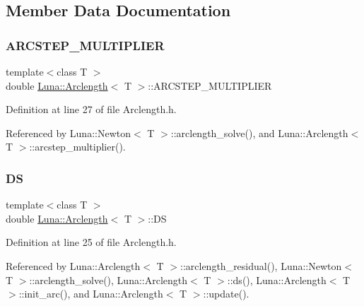 \subsection{Member Data Documentation}
\mbox{\label{classLuna_1_1Arclength_ae1ff8d41d3e81d9ce335d19de4a269cc}} 
\subsubsection{\texorpdfstring{A\+R\+C\+S\+T\+E\+P\+\_\+\+M\+U\+L\+T\+I\+P\+L\+I\+ER}{ARCSTEP\_MULTIPLIER}}
{\footnotesize\ttfamily template$<$class T $>$ \\
double \hyperlink{classLuna_1_1Arclength}{Luna\+::\+Arclength}$<$ T $>$\+::A\+R\+C\+S\+T\+E\+P\+\_\+\+M\+U\+L\+T\+I\+P\+L\+I\+ER\hspace{0.3cm}{\ttfamily [protected]}}



Definition at line 27 of file Arclength.\+h.



Referenced by Luna\+::\+Newton$<$ T $>$\+::arclength\+\_\+solve(), and Luna\+::\+Arclength$<$ T $>$\+::arcstep\+\_\+multiplier().

\mbox{\label{classLuna_1_1Arclength_a6797d7b76d3e27c00b9c4c6ab9970405}} 
\subsubsection{\texorpdfstring{DS}{DS}}
{\footnotesize\ttfamily template$<$class T $>$ \\
double \hyperlink{classLuna_1_1Arclength}{Luna\+::\+Arclength}$<$ T $>$\+::DS\hspace{0.3cm}{\ttfamily [protected]}}



Definition at line 25 of file Arclength.\+h.



Referenced by Luna\+::\+Arclength$<$ T $>$\+::arclength\+\_\+residual(), Luna\+::\+Newton$<$ T $>$\+::arclength\+\_\+solve(), Luna\+::\+Arclength$<$ T $>$\+::ds(), Luna\+::\+Arclength$<$ T $>$\+::init\+\_\+arc(), and Luna\+::\+Arclength$<$ T $>$\+::update().

